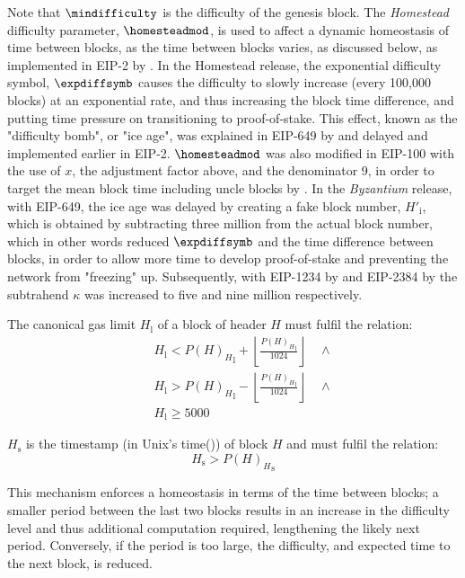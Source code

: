 \documentclass[9pt,oneside]{amsart}
\begin{document}
\begin{multicols}{2}
Note that $\mindifficulty$ is the difficulty of the genesis block. The \textit{Homestead} difficulty parameter, $\homesteadmod$, is used to affect a dynamic homeostasis of time between blocks, as the time between blocks varies, as discussed below, as implemented in EIP-2 by \cite{EIP-2}.
In the Homestead release, the exponential difficulty symbol, $\expdiffsymb$ causes the difficulty to slowly increase (every 100,000 blocks) at an exponential rate, and thus increasing the block time difference, and putting time pressure on transitioning to proof-of-stake.
This effect, known as the "difficulty bomb", or "ice age", was explained in EIP-649 by \cite{EIP-649} and delayed and implemented earlier in EIP-2.
$\homesteadmod$ was also modified in EIP-100 with the use of $x$, the adjustment factor above, and the denominator 9, in order to target the mean block time including uncle blocks by \cite{EIP-100}.
In the \textit{Byzantium} release, with EIP-649, the ice age was delayed by creating a fake block number, $H'_{\mathrm{i}}$, which is obtained by subtracting three million from the actual block number,
which in other words reduced $\expdiffsymb$ and the time difference between blocks, in order to allow more time to develop proof-of-stake and preventing the network from "freezing" up.
Subsequently, with EIP-1234 by \cite{EIP-1234} and EIP-2384 by \cite{EIP-2384} the subtrahend $\kappa$ was increased to five and nine million respectively.

\hypertarget{block_gas_limit_H__l}{}The canonical gas limit $H_{\mathrm{l}}$ of a block of header $H$ must fulfil the relation:
\begin{eqnarray}
& & H_{\mathrm{l}} < {P(H)_{H}}_{\mathrm{l}} + \left\lfloor\frac{{P(H)_{H}}_{\mathrm{l}}}{1024}\right\rfloor \quad \wedge \\
\nonumber& & H_{\mathrm{l}} > {P(H)_{H}}_{\mathrm{l}} - \left\lfloor\frac{{P(H)_{H}}_{\mathrm{l}}}{1024}\right\rfloor \quad \wedge \\
\nonumber& & H_{\mathrm{l}} \geqslant 5000
\end{eqnarray}

\hypertarget{block_timestamp_H__s}{}$H_{\mathrm{s}}$ is the timestamp (in Unix's time()) of block $H$ and must fulfil the relation:
\begin{equation}
H_{\mathrm{s}} > {P(H)_{H}}_{\mathrm{s}}
\end{equation}

This mechanism enforces a homeostasis in terms of the time between blocks; a smaller period between the last two blocks results in an increase in the difficulty level and thus additional computation required, lengthening the likely next period. Conversely, if the period is too large, the difficulty, and expected time to the next block, is reduced.


\end{multicols}
\end{document}
